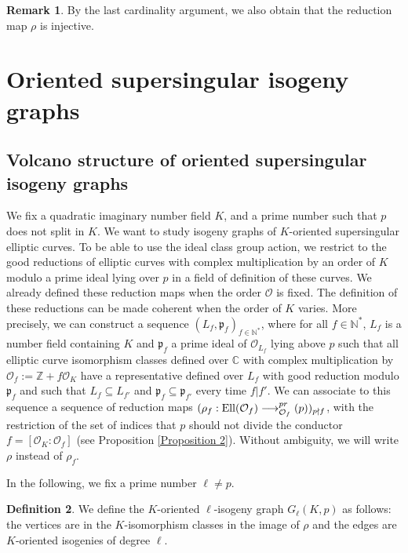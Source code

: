 \documentclass[a4paper,10pt]{report}
\theoremstyle{definition}
\newtheorem{Definition}{Definition}[chapter]
\theoremstyle{plain}
\theoremstyle{definition}
\newtheorem{Remark}[Definition]{Remark}
\newcommand{\N}{\mathbb{N}}
\newcommand{\Z}{\mathbb{Z}}
\newcommand{\C}{\mathbb{C}}
\newcommand{\mO}{\mathcal{O}}
\renewcommand{\(}{\left(}
\renewcommand{\)}{\right)}
\newcommand{\mf}[1]{\mathfrak{#1}}
\let\SS\relax
\DeclareMathOperator{\SS}{SS}
\DeclareMathOperator{\Ell}{Ell}
\begin{document}
\begin{Remark}\label{Remark 1}
By the last cardinality argument, we also obtain that the reduction map $\rho$ is injective.
\end{Remark}

\section{Oriented supersingular isogeny graphs}

\subsection{Volcano structure of oriented supersingular isogeny graphs} 

We fix a quadratic imaginary number field $K$, and a prime number such that $p$ does not split in $K$.  We want to study isogeny graphs of $K$-oriented supersingular elliptic curves. To be able to use the ideal class group action, we restrict to the good reductions of elliptic curves with complex multiplication by an order of $K$ modulo a prime ideal lying over $p$ in a field of definition of these curves.  We already defined these reduction maps when the order $\mO$ is fixed. The definition of these reductions can be made coherent when the order of $K$ varies. More precisely, we can construct a sequence $(L_f,\mf{p}_f)_{f\in\N^*}$, where for all $f\in\N^*$, $L_f$ is a number field containing $K$ and $\mf{p}_f$ a prime ideal of $\mO_{L_f}$ lying above $p$ such that all elliptic curve isomorphism classes defined over $\C$ with complex multiplication by $\mO_f:=\Z+f\mO_K$ have a representative defined over $L_f$ with good reduction modulo $\mf{p}_f$ and such that $L_f\subseteq L_{f'}$ and $\mf{p}_f\subseteq \mf{p}_{f'}$ every time $f|f'$.  We can associate to this sequence a sequence of reduction maps $(\rho_f : \Ell(\mO_f)\longrightarrow\SS_{\mO_f}^{pr}(p))_{p\nmid f}$, with the restriction of the set of indices that $p$ should not divide the conductor $f=[\mO_K:\mO_f]$ (see Proposition \ref{Proposition 2}).  Without ambiguity, we will write $\rho$ instead of $\rho_f$. 

In the following, we fix a prime number $\ell\neq p$.

\begin{Definition}
We define the $K$-oriented $\ell$-isogeny graph $G_\ell(K,p)$ as follows: the vertices are in the $K$-isomorphism classes in the image of $\rho$ and the edges are $K$-oriented isogenies of degree $\ell$.  
\end{Definition}
\end{document}
